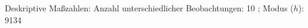 				\label{tableValues:cstu219d_g3}
				\vspace*{-\baselineskip}
                    \begin{noten}
                	    \note{} Deskriptive Maßzahlen:
                	    Anzahl unterschiedlicher Beobachtungen: 10%
                	    ; 
                	      Modus ($h$): 9134
                     \end{noten}


